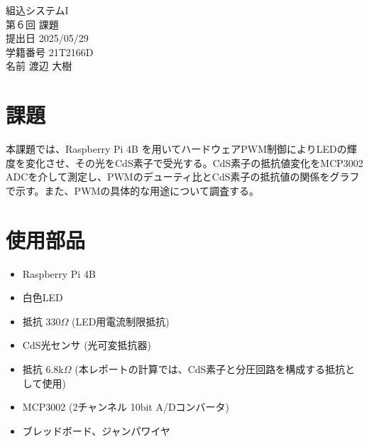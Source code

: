 \documentclass[a4paper,11pt,dvipdfmx]{jsarticle}
\begin{document}

\begin{titlepage}
\noindent
\vspace{4cm}
\begin{center}
\begin{LARGE}
組込システムI \\
第６回  課題 \\
\vspace{8cm}
提出日  2025/05/29 \\
学籍番号  21T2166D \\
名前  渡辺 大樹 \\
\end{LARGE}
\end{center}
\end{titlepage}
\setcounter{page}{1} %

\section{課題}
本課題では、Raspberry Pi 4B を用いてハードウェアPWM制御によりLEDの輝度を変化させ、その光をCdS素子で受光する。CdS素子の抵抗値変化をMCP3002 ADCを介して測定し、PWMのデューティ比とCdS素子の抵抗値の関係をグラフで示す。また、PWMの具体的な用途について調査する。

\section{使用部品}
\begin{itemize}
    \item Raspberry Pi 4B
    \item 白色LED
    \item 抵抗 330$\Omega$ (LED用電流制限抵抗)
    \item CdS光センサ (光可変抵抗器)
    \item 抵抗 6.8k$\Omega$ (本レポートの計算では、CdS素子と分圧回路を構成する抵抗として使用)
    \item MCP3002 (2チャンネル 10bit A/Dコンバータ)
    \item ブレッドボード、ジャンパワイヤ
\end{itemize}
\end{document}
